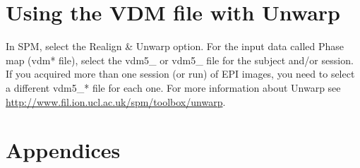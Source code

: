 \section{Using the VDM file with Unwarp \label{VDMuse}}
In SPM, select the Realign \& Unwarp option. For the input data called Phase map (vdm* file), select the vdm5\_\* or vdm5\_\* file for the subject and/or session. If you acquired more than one session (or run) of EPI images, you need to select a different vdm5\_* file for each one. For more information about Unwarp see \url{http://www.fil.ion.ucl.ac.uk/spm/toolbox/unwarp}.

\section{Appendices\label{FMAppendix}}

